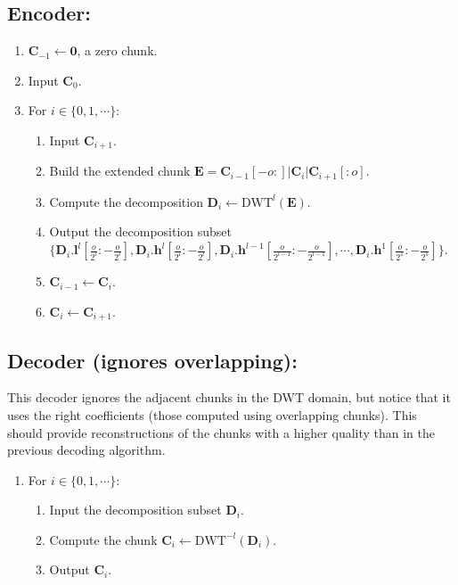 \subsection*{Encoder:}
\begin{enumerate}
\item ${\mathbf C}_{-1}\leftarrow{\mathbf 0}$, a zero chunk.
\item Input ${\mathbf C}_0$.
\item For $i\in\{0,1,\cdots\}$:   
  \begin{enumerate}               
  \item Input ${\mathbf C}_{i+1}$.
  \item Build the extended chunk ${\mathbf E} = {\mathbf
    C}_{i-1}[-o:]|{\mathbf C}_i|{\mathbf C}_{i+1}[:o]$.
  \item Compute the decomposition ${\mathbf D}_i \leftarrow
    \text{DWT}^l({\mathbf E})$.
  \item Output the decomposition subset
    $\Big\{{\mathbf D}_i.{\mathbf l}^l[\frac{o}{2^l}:-\frac{o}{2^l}], {\mathbf
      D}_i.{\mathbf h}^l[\frac{o}{2^l}:-\frac{o}{2^l}], {\mathbf D}_i.{\mathbf
      h}^{l-1}[\frac{o}{2^{l-1}}:-\frac{o}{2^{l-1}}], \cdots, {\mathbf D}_i.{\mathbf
      h}^1[\frac{o}{2^1}:-\frac{o}{2^1}]\Big\}$.
  \item ${\mathbf C}_{i-1}\leftarrow {\mathbf C}_i$.
  \item ${\mathbf C}_i\leftarrow {\mathbf C}_{i+1}$.
  \end{enumerate}
\end{enumerate}


\subsection*{Decoder (ignores overlapping):}
This decoder ignores the adjacent chunks in the DWT domain, but notice that it uses the right coefficients (those computed using overlapping chunks). This should provide reconstructions of the chunks with a higher quality than in the previous decoding algorithm.
\begin{enumerate}
\item For $i\in\{0,1,\cdots\}$:
  \begin{enumerate}
  \item Input the decomposition subset ${\mathbf D}_i$.
  \item Compute the chunk ${\mathbf C}_i\leftarrow\text{DWT}^{-l}({\mathbf D}_i)$.
  \item Output ${\mathbf C}_i$.
  \end{enumerate}
\end{enumerate}

